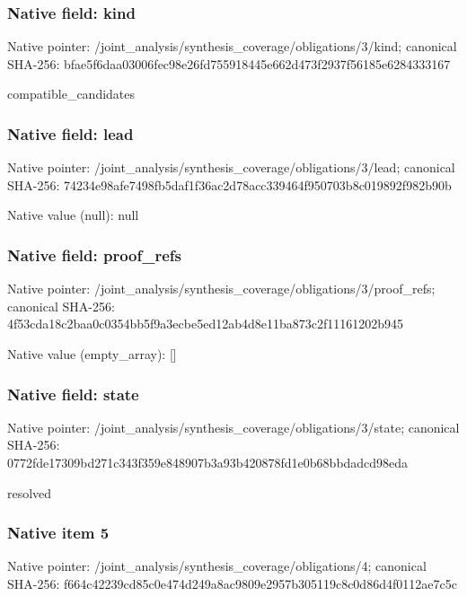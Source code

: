 \documentclass[10pt,a4paper]{article}
\begin{document}
\subsubsection{Native field: kind}
Native pointer: /joint\_\allowbreak{}analysis/synthesis\_\allowbreak{}coverage/obligations/3/kind; canonical SHA-256: bfae5f6daa03006fec98e26fd755918445e662d473f2937f56185e6284333167

\begingroup\raggedright\sloppy compatible\_\allowbreak{}candidates\par\endgroup

\subsubsection{Native field: lead}
Native pointer: /joint\_\allowbreak{}analysis/synthesis\_\allowbreak{}coverage/obligations/3/lead; canonical SHA-256: 74234e98afe7498fb5daf1f36ac2d78acc339464f950703b8c019892f982b90b

Native value (null): null

\subsubsection{Native field: proof\_\allowbreak{}refs}
Native pointer: /joint\_\allowbreak{}analysis/synthesis\_\allowbreak{}coverage/obligations/3/proof\_\allowbreak{}refs; canonical SHA-256: 4f53cda18c2baa0c0354bb5f9a3ecbe5ed12ab4d8e11ba873c2f11161202b945

Native value (empty\_\allowbreak{}array): []

\subsubsection{Native field: state}
Native pointer: /joint\_\allowbreak{}analysis/synthesis\_\allowbreak{}coverage/obligations/3/state; canonical SHA-256: 0772fde17309bd271c343f359e848907b3a93b420878fd1e0b68bbdadcd98eda

\begingroup\raggedright\sloppy resolved\par\endgroup

\subsubsection{Native item 5}
Native pointer: /joint\_\allowbreak{}analysis/synthesis\_\allowbreak{}coverage/obligations/4; canonical SHA-256: f664c42239cd85c0e474d249a8ac9809e2957b305119c8c0d86d4f0112ae7c5c
\end{document}
